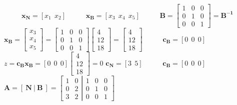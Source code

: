 {\begin{minipage}[l]{14,2cm}
 \ \ \ \ \ $\mathbf{x{_N}}=[x{_1}\ \ x{_2}]$ \ \ \ \ \ $\mathbf{x{_B}}=[x{_3}\ \ x{_4}\ \ x{_5}]$
 \ \ \ \ \ $\mathbf{B}=\begin{bmatrix}
1 & 0 & 0 \\
0 & 1 & 0 \\
0 & 0 & 1
\end{bmatrix} = \mathbf{B^{-1}}$
\\ $\mathbf{x{_B}}=\begin{bmatrix}
x{_3} \\
x{_4} \\
x{_5} 
\end{bmatrix} = \begin{bmatrix}
1 & 0 & 0 \\
0 & 1 & 0 \\
0 & 0 & 1
\end{bmatrix}\begin{bmatrix}
4 \\
12 \\
18 
\end{bmatrix} = \begin{bmatrix}
4 \\
12 \\
18 
\end{bmatrix}$ \ \ \ \ \ $\mathbf{c{_B}}=[0\ \ 0\ \ 0]$
\\$z = \mathbf{c{_B}}\mathbf{x{_B}} = [0\ \ 0\ \ 0]\begin{bmatrix}
4 \\
12 \\
18 
\end{bmatrix} = 0$
$\mathbf{c{_N}}=[3\ \ 5]$ \ \ \ \ \ $\mathbf{c{_B}}=[0\ \ 0\ \ 0]$ \ \ \ \ \ $\mathbf{A}=[\ \mathbf{N}\ |\ \mathbf{B}\ ]=\left [ \left.\begin{matrix}
1 & 0 \\
0 & 2 \\
3 & 2 
\end{matrix}\right|
\begin{matrix}
1 & 0 & 0 \\
0 & 1 & 0 \\
0 & 0 & 1
\end{matrix} \right ]$ \ \ \ \ \ 
\end{minipage}
}


